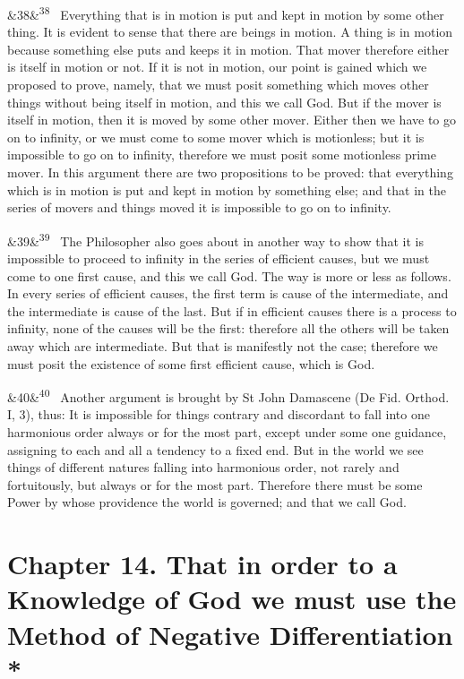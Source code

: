 \documentclass[12pt]{article}
\newcommand{\para}[1][]{\par\noindent\ifx&#1&\else\textsuperscript{\footnotesize #1}~\fi}
\begin{document}
\para[38] Everything that is in motion is put and kept in motion by some other thing. It is evident to sense that there are beings in motion. A thing is in motion because something else puts and keeps it in motion. That mover therefore either is itself in motion or not. If it is not in motion, our point is gained which we proposed to prove, namely, that we must posit something which moves other things without being itself in motion, and this we call God. But if the mover is itself in motion, then it is moved by some other mover. Either then we have to go on to infinity, or we must come to some mover which is motionless; but it is impossible to go on to infinity, therefore we must posit some motionless prime mover. In this argument there are two propositions to be proved: that everything which is in motion is put and kept in motion by something else; and that in the series of movers and things moved it is impossible to go on to infinity.

\para[39] The Philosopher also goes about in another way to show that it is impossible to proceed to infinity in the series of efficient causes, but we must come to one first cause, and this we call God. The way is more or less as follows. In every series of efficient causes, the first term is cause of the intermediate, and the intermediate is cause of the last. But if in efficient causes there is a process to infinity, none of the causes will be the first: therefore all the others will be taken away which are intermediate. But that is manifestly not the case; therefore we must posit the existence of some first efficient cause, which is God.

\para[40] Another argument is brought by St John Damascene (De Fid. Orthod. I, 3), thus: It is impossible for things contrary and discordant to fall into one harmonious order always or for the most part, except under some one guidance, assigning to each and all a tendency to a fixed end. But in the world we see things of different natures falling into harmonious order, not rarely and fortuitously, but always or for the most part. Therefore there must be some Power by whose providence the world is governed; and that we call God.

\section*{Chapter 14. That in order to a Knowledge of God we must use the Method of Negative Differentiation *}
\end{document}
